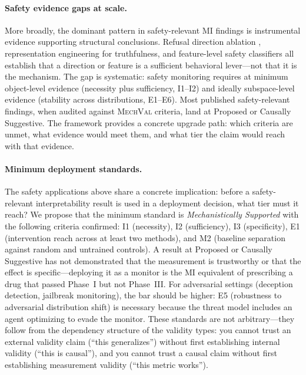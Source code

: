 \documentclass{article}
\newcommand{\mechval}{\textsc{MechVal}}
\begin{document}
\paragraph{Safety evidence gaps at scale.}
More broadly, the dominant pattern in safety-relevant MI findings is instrumental evidence supporting structural conclusions.  Refusal direction ablation \citep{turner2024activation}, representation engineering for truthfulness, and feature-level safety classifiers all establish that a direction or feature is a sufficient behavioral lever---not that it is the mechanism.  The gap is systematic: safety monitoring requires at minimum object-level evidence (necessity plus sufficiency, I1--I2) and ideally subspace-level evidence (stability across distributions, E1--E6).  Most published safety-relevant findings, when audited against \mechval{} criteria, land at Proposed or Causally Suggestive.  The framework provides a concrete upgrade path: which criteria are unmet, what evidence would meet them, and what tier the claim would reach with that evidence.

\paragraph{Minimum deployment standards.}
The safety applications above share a concrete implication: before a safety-relevant interpretability result is used in a deployment decision, what tier must it reach? We propose that the minimum standard is \emph{Mechanistically Supported} with the following criteria confirmed: I1 (necessity), I2 (sufficiency), I3 (specificity), E1 (intervention reach across at least two methods), and M2 (baseline separation against random and untrained controls). A result at Proposed or Causally Suggestive has not demonstrated that the measurement is trustworthy or that the effect is specific---deploying it as a monitor is the MI equivalent of prescribing a drug that passed Phase~I but not Phase~III. For adversarial settings (deception detection, jailbreak monitoring), the bar should be higher: E5 (robustness to adversarial distribution shift) is necessary because the threat model includes an agent optimizing to evade the monitor. These standards are not arbitrary---they follow from the dependency structure of the validity types: you cannot trust an external validity claim (``this generalizes'') without first establishing internal validity (``this is causal''), and you cannot trust a causal claim without first establishing measurement validity (``this metric works'').
\end{document}
